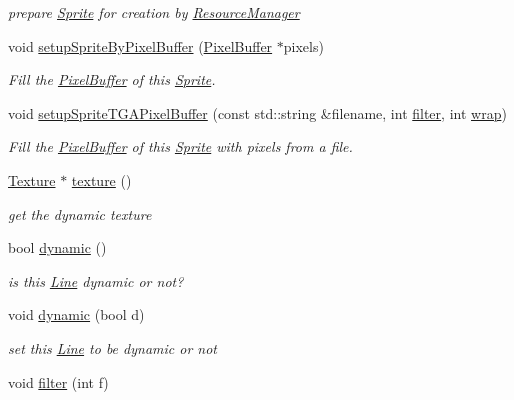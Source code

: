\begin{DoxyCompactItemize}
\begin{DoxyCompactList}\small\item\em prepare \hyperlink{class_sprite}{Sprite} for creation by \hyperlink{class_resource_manager}{Resource\+Manager} \end{DoxyCompactList}\item 
void \hyperlink{class_sprite_ad0f4f4d9337f5da714183d4eaec29d42}{setup\+Sprite\+By\+Pixel\+Buffer} (\hyperlink{struct_pixel_buffer}{Pixel\+Buffer} $\ast$pixels)
\begin{DoxyCompactList}\small\item\em Fill the \hyperlink{struct_pixel_buffer}{Pixel\+Buffer} of this \hyperlink{class_sprite}{Sprite}. \end{DoxyCompactList}\item 
void \hyperlink{class_sprite_a7f713b5e91889cba8202ffc91b60be84}{setup\+Sprite\+T\+G\+A\+Pixel\+Buffer} (const std\+::string \&filename, int \hyperlink{class_sprite_a02160c2a56ce86d59b827899bab9c5b5}{filter}, int \hyperlink{class_sprite_a0e10957a274ba27a38601eac1fda210c}{wrap})
\begin{DoxyCompactList}\small\item\em Fill the \hyperlink{struct_pixel_buffer}{Pixel\+Buffer} of this \hyperlink{class_sprite}{Sprite} with pixels from a file. \end{DoxyCompactList}\item 
\hyperlink{class_texture}{Texture} $\ast$ \hyperlink{class_sprite_a455494cddd7e1b8397f1c48cb5d461ec}{texture} ()
\begin{DoxyCompactList}\small\item\em get the dynamic texture \end{DoxyCompactList}\item 
bool \hyperlink{class_sprite_addbab8d45f865a551c5e012a4f63b8b7}{dynamic} ()
\begin{DoxyCompactList}\small\item\em is this \hyperlink{class_line}{Line} dynamic or not? \end{DoxyCompactList}\item 
void \hyperlink{class_sprite_a8164c86f45c115f8b45ddf2dc72f7be8}{dynamic} (bool d)
\begin{DoxyCompactList}\small\item\em set this \hyperlink{class_line}{Line} to be dynamic or not \end{DoxyCompactList}\item 
void \hyperlink{class_sprite_a02160c2a56ce86d59b827899bab9c5b5}{filter} (int f)

\end{DoxyCompactItemize}
